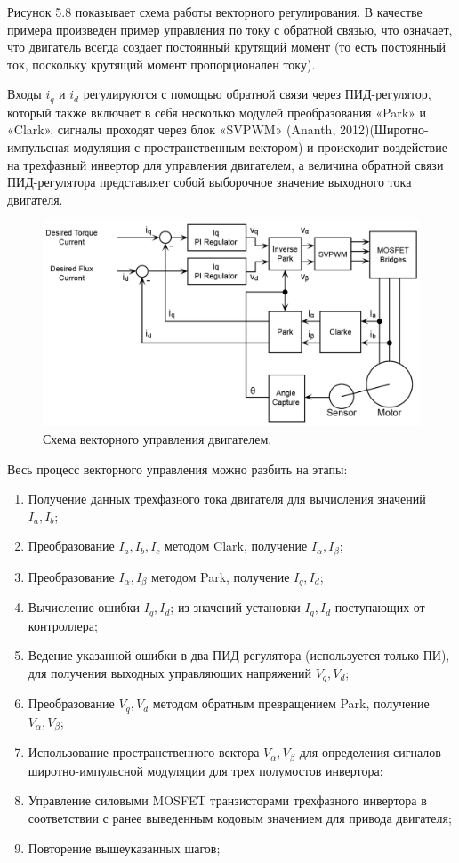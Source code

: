 Рисунок 5.8 показывает схема работы векторного регулирования. В качестве примера произведен пример управления по току с обратной связью, что означает, что двигатель всегда создает постоянный крутящий момент (то есть постоянный ток, поскольку крутящий момент пропорционален току).

Входы $i_q$ и $i_d$ регулируются с помощью обратной связи через ПИД-регулятор, который также включает в себя несколько модулей преобразования «Park» и «Clark», сигналы проходят через блок «SVPWM» (Ananth, 2012)(Широтно-импульсная модуляция с пространственным вектором) и происходит воздействие на трехфазный инвертор для управления двигателем, а величина обратной связи ПИД-регулятора представляет собой выборочное значение выходного тока двигателя.

\begin{figure}[H]
	\centering
	\includegraphics[width=\textwidth]{Src/images/FOCALG.png}
	\caption{Схема векторного управления двигателем.}
	\label{ACDFOCALG}
\end{figure}


Весь процесс векторного управления можно разбить на этапы:
\begin{enumerate}
	\item Получение данных трехфазного тока двигателя для вычисления значений $I_a,I_b$;
	\item Преобразование $I_a,I_b,I_c$ методом Clark, получение $I_\alpha,I_\beta$;
	\item Преобразование $I_\alpha,I_\beta$ методом Park, получение $I_q,I_d$;
	\item Вычисление ошибки $I_q,I_d$; из значений установки $I_q,I_d$ поступающих от контроллера;
	\item Ведение указанной ошибки в два ПИД-регулятора (используется только ПИ), для получения выходных управляющих напряжений $V_q,V_d$;
	\item Преобразование $V_q,V_d$ методом обратным превращением Park, получение $V_\alpha,V_\beta$;
	\item Использование пространственного вектора $V_\alpha,V_\beta$ для определения сигналов широтно-импульсной модуляции для трех полумостов инвертора;
	\item Управление силовыми MOSFET транзисторами трехфазного инвертора в соответствии с ранее выведенным кодовым значением для привода двигателя;
	\item Повторение вышеуказанных шагов;
\end{enumerate}

